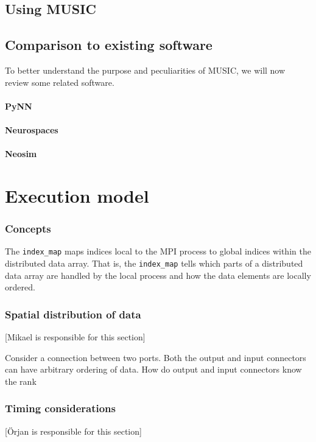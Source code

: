 \documentclass[a4paper]{report}
\newcommand{\responsible}[1]%
{{\color{red}[#1 is responsible for this section]}}
\begin{document}
\section{Using MUSIC}


\section{Comparison to existing software}

To better understand the purpose and peculiarities of MUSIC, we will
now review some related software.

\subsubsection{PyNN}

\subsubsection{Neurospaces}

\subsubsection{Neosim}


\chapter{Execution model}

\subsection{Concepts}

The \verb|index_map| maps indices local to the MPI process to global
indices within the distributed data array.  That is, the
\verb|index_map| tells which parts of a distributed data array are
handled by the local process and how the data elements are locally
ordered.

\subsection{Spatial distribution of data}
\responsible{Mikael}

Consider a connection between two ports.  Both the output and input
connectors can have arbitrary ordering of data.  How do output and
input connectors know the rank

\subsection{Timing considerations}
\responsible{Örjan}
\end{document}
